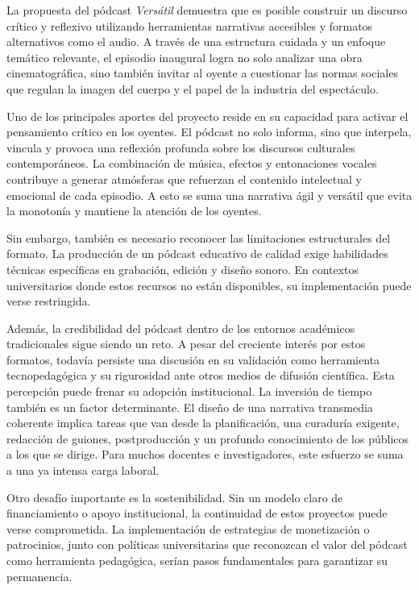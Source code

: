 \documentclass[
  spanish,
  11pt,
  a4paper,
]{scrbook}
\begin{document}
\endgroup

La propuesta del pódcast \emph{Versátil} demuestra que es posible
construir un discurso crítico y reflexivo utilizando herramientas
narrativas accesibles y formatos alternativos como el audio. A través de
una estructura cuidada y un enfoque temático relevante, el episodio
inaugural logra no solo analizar una obra cinematográfica, sino también
invitar al oyente a cuestionar las normas sociales que regulan la imagen
del cuerpo y el papel de la industria del espectáculo.

Uno de los principales aportes del proyecto reside en su capacidad para
activar el pensamiento crítico en los oyentes. El pódcast no solo
informa, sino que interpela, vincula y provoca una reflexión profunda
sobre los discursos culturales contemporáneos. La combinación de música,
efectos y entonaciones vocales contribuye a generar atmósferas que
refuerzan el contenido intelectual y emocional de cada episodio. A esto
se suma una narrativa ágil y versátil que evita la monotonía y mantiene
la atención de los oyentes.

Sin embargo, también es necesario reconocer las limitaciones
estructurales del formato. La producción de un pódcast educativo de
calidad exige habilidades técnicas específicas en grabación, edición y
diseño sonoro. En contextos universitarios donde estos recursos no están
disponibles, su implementación puede verse restringida.

Además, la credibilidad del pódcast dentro de los entornos académicos
tradicionales sigue siendo un reto. A pesar del creciente interés por
estos formatos, todavía persiste una discusión en su validación como
herramienta tecnopedagógica y su rigurosidad ante otros medios de
difusión científica. Esta percepción puede frenar su adopción
institucional. La inversión de tiempo también es un factor determinante.
El diseño de una narrativa transmedia coherente implica tareas que van
desde la planificación, una curaduría exigente, redacción de guiones,
postproducción y un profundo conocimiento de los públicos a los que se
dirige. Para muchos docentes e investigadores, este esfuerzo se suma a
una ya intensa carga laboral.

Otro desafío importante es la sostenibilidad. Sin un modelo claro de
financiamiento o apoyo institucional, la continuidad de estos proyectos
puede verse comprometida. La implementación de estrategias de
monetización o patrocinios, junto con políticas universitarias que
reconozcan el valor del pódcast como herramienta pedagógica, serían
pasos fundamentales para garantizar su permanencia.
\end{document}
